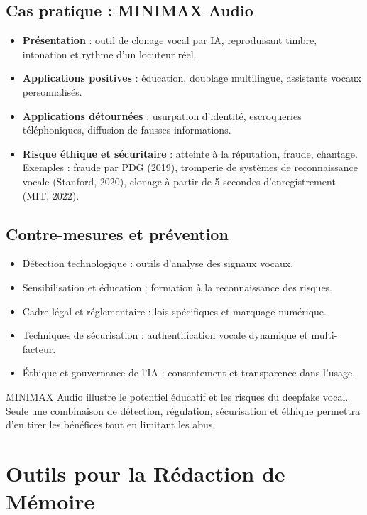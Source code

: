 \documentclass[12pt]{article}
\begin{document}
\begin{center}
\subsection*{Cas pratique : MINIMAX Audio}
\begin{itemize}[leftmargin=*, label=\textbullet]
    \item \textbf{Présentation} : outil de clonage vocal par IA, reproduisant timbre, intonation et rythme d'un locuteur réel.
    \item \textbf{Applications positives} : éducation, doublage multilingue, assistants vocaux personnalisés.
    \item \textbf{Applications détournées} : usurpation d'identité, escroqueries téléphoniques, diffusion de fausses informations.
    \item \textbf{Risque éthique et sécuritaire} : atteinte à la réputation, fraude, chantage. Exemples : fraude par PDG (2019), tromperie de systèmes de reconnaissance vocale (Stanford, 2020), clonage à partir de 5 secondes d’enregistrement (MIT, 2022).
\end{itemize}

\subsection{Contre-mesures et prévention}
\begin{itemize}[leftmargin=*, label=\textbullet]
    \item Détection technologique : outils d'analyse des signaux vocaux.
    \item Sensibilisation et éducation : formation à la reconnaissance des risques.
    \item Cadre légal et réglementaire : lois spécifiques et marquage numérique.
    \item Techniques de sécurisation : authentification vocale dynamique et multi-facteur.
    \item Éthique et gouvernance de l'IA : consentement et transparence dans l’usage.
\end{itemize}

MINIMAX Audio illustre le potentiel éducatif et les risques du deepfake vocal. Seule une combinaison de détection, régulation, sécurisation et éthique permettra d’en tirer les bénéfices tout en limitant les abus.

\section{Outils pour la Rédaction de Mémoire}


\end{center}
\end{document}
